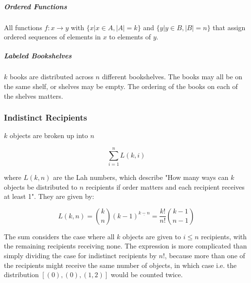 \subparagraph{Ordered Functions}  All functions $f: x \rightarrow y$ with $\{x | x\in A, |A| = k \}$ and $\{y | y\in B, |B| = n\}$ that assign ordered sequences of elements in $x$ to elements of $y$.

\subparagraph{Labeled Bookshelves} $k$ books are distributed across $n$ different bookshelves. The books may all be on the same shelf, or shelves may be empty. The ordering of the books on each of the shelves matters.


\subsubsection{Indistinct Recipients}
$k$ objects are broken up into $n$ 

\begin{equation}
\sum_{i=1}^n L(k,i) 
\end{equation}

where $L(k,n)$ are the Lah numbers, which describe "How many ways can $k$ objects be distributed to $n$ recipients if order matters and each recipient receives at least 1". They are given by:

\begin{equation}
L(k,n)= {k \choose n} (k-1)^{\underline{k-n}} = \frac{k!}{n!}{ k-1 \choose n-1 }
\end{equation}

The sum considers the case where all $k$ objects are given to $i\leq n$ recipients, with the remaining recipients receiving none. The expression is more complicated than simply dividing the case for indistinct recipients by $n!$, because more than one of the recipients might receive the same number of objects, in which case i.e. the distribution $[(0),(0),(1,2)]$ would be counted twice.

\chapauthor{}








